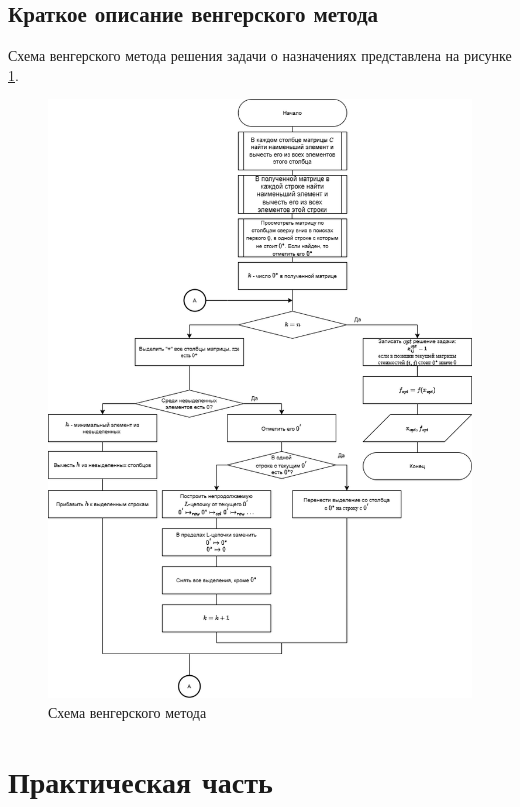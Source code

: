 \documentclass[a4paper,12pt, unknownkeysallowed]{extreport}
\begin{document}
\section{Краткое описание венгерского метода}

Схема венгерского метода решения задачи о назначениях представлена на рисунке \ref{fig:alg}.
\begin{figure}[H]
	\centering
	\includegraphics[width=1\linewidth]{alg}
	\caption[]{Схема венгерского метода}
	\label{fig:alg}
\end{figure}


\chapter{Практическая часть}
\end{document}
